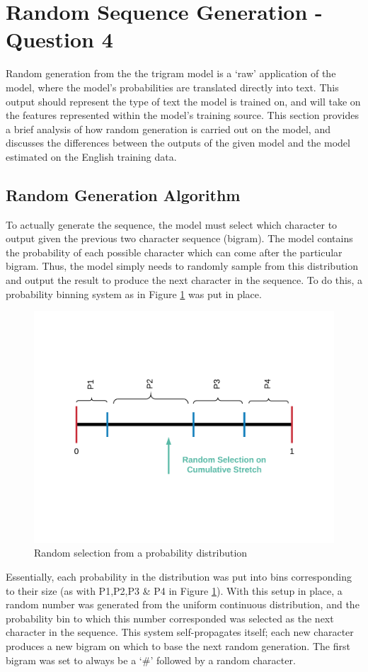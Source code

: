 \documentclass[12pt]{article}
\begin{document}
\section{Random Sequence Generation - Question 4}
Random generation from the the trigram model is a `raw' application of the model, where the model's probabilities are translated directly into text.  This output should represent the type of text the model is trained on, and will  take on the features represented within the model's training source.  This section provides a brief analysis of how random generation is carried out on the model, and discusses the differences between the outputs of the given model and the model estimated on the English training data.
\subsection{Random Generation Algorithm}
To actually generate the sequence, the model must select which character to output given the previous two character sequence (bigram).  The model contains the probability of each possible character which can come after the particular bigram.  Thus, the model simply needs to randomly sample from this distribution and output the result to produce the next character in the sequence.  To do this, a probability binning system as in Figure \ref{fig:randomgen} was put in place.
\begin{figure}[H]
	\centering
	\includegraphics[width=0.7\linewidth]{graphics/Random_Gen}
	\caption{Random selection from a probability distribution}
	\label{fig:randomgen}
\end{figure}
Essentially, each probability in the distribution was put into bins corresponding to their size (as with P1,P2,P3 \& P4 in Figure \ref{fig:randomgen}).  With this setup in place, a random number was generated from the uniform continuous distribution, and the probability bin to which this number corresponded was selected as the next character in the sequence.  This system self-propagates itself; each new character produces a new bigram on which to base the next random generation.  The first bigram was set to always be a `\#' followed by a random character.\\
\end{document}
